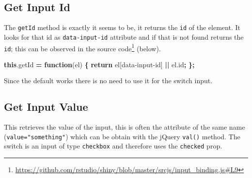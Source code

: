 \documentclass[
]{krantz}
\makeatletter
\newenvironment{Shaded}{\begin{snugshade}}{\end{snugshade}}
\newcommand{\AttributeTok}[1]{\textcolor[rgb]{0.61,0.61,0.61}{#1}}
\newcommand{\CommentTok}[1]{\textcolor[rgb]{0.37,0.37,0.37}{\textit{#1}}}
\newcommand{\ControlFlowTok}[1]{\textcolor[rgb]{0.27,0.27,0.27}{\textbf{#1}}}
\newcommand{\DataTypeTok}[1]{\textcolor[rgb]{0.27,0.27,0.27}{#1}}
\newcommand{\KeywordTok}[1]{\textcolor[rgb]{0.27,0.27,0.27}{\textbf{#1}}}
\newcommand{\NormalTok}[1]{#1}
\newcommand{\OperatorTok}[1]{\textcolor[rgb]{0.43,0.43,0.43}{\textbf{#1}}}
\newcommand{\StringTok}[1]{\textcolor[rgb]{0.5,0.5,0.5}{#1}}
\newcommand{\VariableTok}[1]{\textcolor[rgb]{0,0,0}{#1}}
\renewcommand{\href}[2]{#2\footnote{\url{#1}}}
\newenvironment{kframe}{%
\medskip{}
\setlength{\fboxsep}{.8em}
 \def\at@end@of@kframe{}%
 \ifinner\ifhmode%
  \def\at@end@of@kframe{\end{minipage}}%
  \begin{minipage}{\columnwidth}%
 \fi\fi%
 \def\FrameCommand##1{\hskip\@totalleftmargin \hskip-\fboxsep
 \colorbox{shadecolor}{##1}\hskip-\fboxsep
     \hskip-\linewidth \hskip-\@totalleftmargin \hskip\columnwidth}%
 \MakeFramed {\advance\hsize-\width
   \@totalleftmargin\z@ \linewidth\hsize
   \@setminipage}}%
 {\par\unskip\endMakeFramed%
 \at@end@of@kframe}
\renewenvironment{Shaded}{\begin{kframe}}{\end{kframe}}
\makeatother
\begin{document}
\hypertarget{shiny-input-get-id}{%
\subsection{Get Input Id}\label{shiny-input-get-id}}

The \texttt{getId} method is exactly it seems to be, it returns the \texttt{id} of the element. It looks for that id as \texttt{data-input-id} attribute and if that is not found returns the \texttt{id}; this can be observed in the \href{https://github.com/rstudio/shiny/blob/master/srcjs/input_binding.js\#L9}{source code} (below).

\begin{Shaded}
\begin{Highlighting}[]
\KeywordTok{this}\NormalTok{.}\AttributeTok{getId} \OperatorTok{=} \KeywordTok{function}\NormalTok{(el) }\OperatorTok{\{}
  \ControlFlowTok{return}\NormalTok{ el[}\StringTok{\textquotesingle{}data{-}input{-}id\textquotesingle{}}\NormalTok{] }\OperatorTok{||} \VariableTok{el}\NormalTok{.}\AttributeTok{id}\OperatorTok{;}
\OperatorTok{\};}
\end{Highlighting}
\end{Shaded}

Since the default works there is no need to use it for the switch input.

\hypertarget{shiny-input-get-value}{%
\subsection{Get Input Value}\label{shiny-input-get-value}}

This retrieves the value of the input, this is often the attribute of the same name (\texttt{value="something"}) which can be obtain with the jQuery \texttt{val()} method. The switch is an input of type \texttt{checkbox} and therefore uses the \texttt{checked} prop.

\begin{Shaded}
\end{Shaded}
\end{document}
